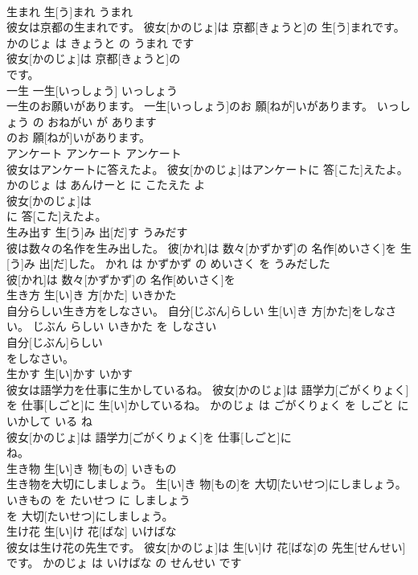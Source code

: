 \documentclass[8pt]{extreport}
\begin{document}
\begin{CJK}{UTF8}{min}
\\	生まれ	生[う]まれ	うまれ	
\\	彼女は京都の生まれです。	彼女[かのじょ]は 京都[きょうと]の 生[う]まれです。	かのじょ は きょうと の うまれ です	
\\	彼女[かのじょ]は 京都[きょうと]の
\\	です。			
\\	一生	一生[いっしょう]	いっしょう	
\\	一生のお願いがあります。	一生[いっしょう]のお 願[ねが]いがあります。	いっしょう の おねがい が あります	
\\	のお 願[ねが]いがあります。			
\\	アンケート	アンケート	アンケート	
\\	彼女はアンケートに答えたよ。	彼女[かのじょ]はアンケートに 答[こた]えたよ。	かのじょ は あんけーと に こたえた よ	
\\	彼女[かのじょ]は
\\	に 答[こた]えたよ。			
\\	生み出す	生[う]み 出[だ]す	うみだす	
\\	彼は数々の名作を生み出した。	彼[かれ]は 数々[かずかず]の 名作[めいさく]を 生[う]み 出[だ]した。	かれ は かずかず の めいさく を うみだした	
\\	彼[かれ]は 数々[かずかず]の 名作[めいさく]を
\\	生き方	生[い]き 方[かた]	いきかた	
\\	自分らしい生き方をしなさい。	自分[じぶん]らしい 生[い]き 方[かた]をしなさい。	じぶん らしい いきかた を しなさい	
\\	自分[じぶん]らしい
\\	をしなさい。			
\\	生かす	生[い]かす	いかす	
\\	彼女は語学力を仕事に生かしているね。	彼女[かのじょ]は 語学力[ごがくりょく]を 仕事[しごと]に 生[い]かしているね。	かのじょ は ごがくりょく を しごと に いかして いる ね	
\\	彼女[かのじょ]は 語学力[ごがくりょく]を 仕事[しごと]に
\\	ね。			
\\	生き物	生[い]き 物[もの]	いきもの	
\\	生き物を大切にしましょう。	生[い]き 物[もの]を 大切[たいせつ]にしましょう。	いきもの を たいせつ に しましょう	
\\	を 大切[たいせつ]にしましょう。			
\\	生け花	生[い]け 花[ばな]	いけばな	
\\	彼女は生け花の先生です。	彼女[かのじょ]は 生[い]け 花[ばな]の 先生[せんせい]です。	かのじょ は いけばな の せんせい です	

\end{CJK}
\end{document}
